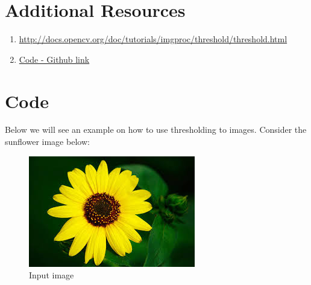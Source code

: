 \documentclass[]{article}
\providecommand{\tightlist}{%
  \setlength{\itemsep}{0pt}\setlength{\parskip}{0pt}}
\begin{document}
\section{Additional Resources}\label{additional-resources}

\begin{enumerate}
	\def\labelenumi{\arabic{enumi})}
	\tightlist
	\item
	\url{http://docs.opencv.org/doc/tutorials/imgproc/threshold/threshold.html}
	\item \href{https://github.com/eyantrainternship/eYSIP_2015_Marker_based_Robot_Localisation/blob/master/Task-2/Thresholding/src/thresholding.py}{Code - Github link}
\end{enumerate}


\section{Code}\label{code}

Below we will see an example on how to use thresholding to images.
Consider the sunflower image below:
\begin{figure}[h]
	\centering
	\includegraphics{sun.jpg}
	\caption{Input image}
\end{figure}
\end{document}
